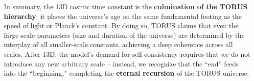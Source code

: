 \documentclass[]{article}
\begin{document}
In summary, the 13D cosmic time constant is the \textbf{culmination of
the TORUS hierarchy}: it places the universe's age on the same
fundamental footing as the speed of light or Planck's constant. By doing
so, TORUS claims that even the large-scale parameters (size and duration
of the universe) are determined by the interplay of all smaller-scale
constants, achieving a deep coherence across all scales. After 13D, the
model's demand for self-consistency requires that we do not introduce
any new arbitrary scale -- instead, we recognize that the ``end'' feeds
into the ``beginning,'' completing the \textbf{eternal recursion} of the
TORUS universe​.
\end{document}
